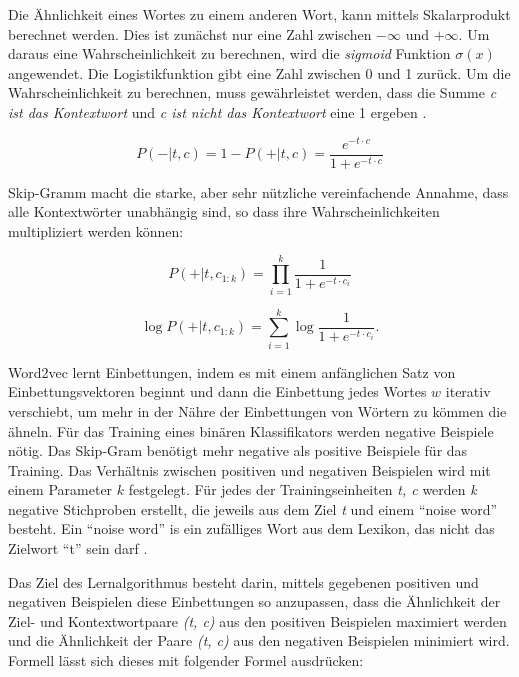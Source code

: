 Die Ähnlichkeit eines Wortes zu einem anderen Wort, kann mittels Skalarprodukt berechnet werden. Dies ist zunächst nur eine Zahl zwischen $-\infty$ und $+\infty$. Um daraus eine Wahrscheinlichkeit zu berechnen, wird die \textit{sigmoid} Funktion $\sigma(x)$ angewendet. Die Logistikfunktion gibt eine Zahl zwischen 0 und 1 zurück. Um die Wahrscheinlichkeit zu berechnen, muss gewährleistet werden, dass die Summe \textit{c ist das Kontextwort} und \textit{c ist nicht das Kontextwort} eine 1 ergeben \cite*[112]{Jurafskya}.

\begin{equation} \label{Formel3_2}
    P(-|t,c) = 1-P(+|t,c) = \frac{e^{-t\cdot c}}{1+e^{-t\cdot c}}
\end{equation}

Skip-Gramm macht die starke, aber sehr nützliche vereinfachende Annahme, dass alle Kontextwörter unabhängig sind, so dass ihre Wahrscheinlichkeiten multipliziert werden können:

\begin{equation} \label{Formel3_3}
    P(+|t,c_{1:k}) = \prod ^{k}_{i=1}\frac{1}{1+e^{-t\cdot c_{i}}}
\end{equation}

\begin{equation} \label{Formel3_4}
    \log P(+|t,c_{1:k}) =\sum ^{k}_{i=1} \log \frac{1}{1+e^{-t\cdot c_{i}}}.
\end{equation}


Word2vec lernt Einbettungen, indem es mit einem anfänglichen Satz von Einbettungsvektoren beginnt und dann die Einbettung jedes Wortes $w$ iterativ verschiebt, um mehr in der Nähre der Einbettungen von Wörtern zu kömmen die ähneln. Für das Training eines binären Klassifikators werden negative Beispiele nötig. Das Skip-Gram benötigt mehr negative als positive Beispiele für das Training. Das Verhältnis zwischen positiven und negativen Beispielen wird mit einem Parameter $k$ festgelegt. Für jedes der Trainingseinheiten \textit{t, c} werden \textit{k} negative Stichproben erstellt, die jeweils aus dem Ziel \textit{t} und einem \enquote{noise word} besteht. Ein \enquote{noise word} is ein zufälliges Wort aus dem Lexikon, das nicht das Zielwort \enquote{t} sein darf \cite*[113]{Jurafskya}.

Das Ziel des Lernalgorithmus besteht darin, mittels gegebenen positiven und negativen Beispielen diese Einbettungen so anzupassen, dass die Ähnlichkeit der Ziel- und Kontextwortpaare \textit{(t, c)} aus den positiven Beispielen maximiert werden und die Ähnlichkeit der Paare \textit{(t, c)} aus den negativen Beispielen minimiert wird. Formell lässt sich dieses mit folgender Formel ausdrücken:

